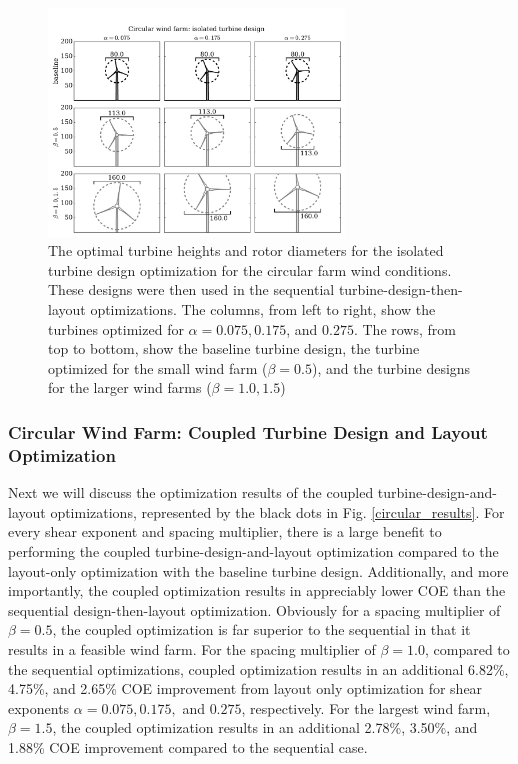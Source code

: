 \begin{figure}[htbp]
  \centering
  \includegraphics[trim={0.5cm 0.3cm 0.3cm 2.75cm},clip,width=0.7\textwidth]{Figures/turbineSizesCircular_sequential.pdf}
  \caption{\label{circular_turbines_seq} The optimal turbine heights and rotor diameters for the isolated turbine design optimization for the circular farm wind conditions. These designs were then used in the sequential turbine-design-then-layout optimizations. The columns, from left to right, show the turbines optimized for $\alpha=0.075,0.175$, and $0.275$. The rows, from top to bottom, show the baseline turbine design, the turbine optimized for the small wind farm ($\beta=0.5$), and the turbine designs for the larger wind farms ($\beta=1.0,1.5$)}
\end{figure}



\subsubsection{Circular Wind Farm: Coupled Turbine Design and Layout Optimization}
Next we will discuss the optimization results of the coupled turbine-design-and-layout optimizations, represented by the black dots in Fig. \ref{circular_results}. For every shear exponent and spacing multiplier, there is a large benefit to performing the coupled turbine-design-and-layout optimization compared to the layout-only optimization with the baseline turbine design. Additionally, and more importantly, the coupled optimization results in appreciably lower COE than the sequential design-then-layout optimization. Obviously for a spacing multiplier of $\beta=0.5$, the coupled optimization is far superior to the sequential in that it results in a feasible wind farm. For the spacing multiplier of $\beta=1.0$, 
compared to the sequential optimizations, coupled optimization results in an additional 6.82\%, 4.75\%, and 2.65\% COE improvement from layout only optimization for shear exponents $\alpha=0.075, 0.175,$ and $0.275$, respectively. For the largest wind farm, $\beta=1.5$, the coupled optimization results in an additional 2.78\%, 3.50\%, and 1.88\% COE improvement compared to the sequential case. 

